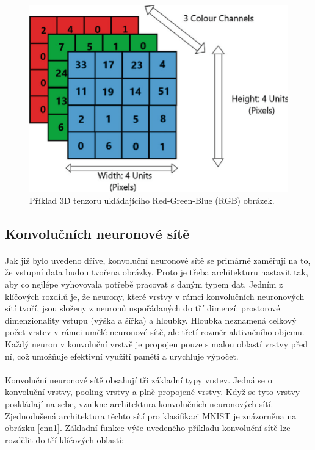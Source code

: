 \begin{figure}[h]\centering
    \centering
    \includegraphics[width=0.9\linewidth]{obrazky-figures/tensor.png}
    \caption{Příklad 3D tenzoru ukládajícího Red-Green-Blue (RGB) obrázek\protect\footnotemark{}.}
    \label{rgb_tensor}
\end{figure}

\subsection*{Konvolučních neuronové sítě}
\paragraph{}Jak již bylo uvedeno dříve, konvoluční neuronové sítě se primárně zaměřují na to, že vstupní data budou tvořena obrázky. Proto je třeba architekturu nastavit tak, aby co nejlépe vyhovovala potřebě pracovat s daným typem dat.
Jedním z klíčových rozdílů je, že neurony, které vrstvy v rámci konvolučních neuronových sítí tvoří, jsou složeny z neuronů uspořádaných do tří dimenzí: prostorové dimenzionality vstupu (výška a šířka) a hloubky. Hloubka neznamená celkový počet vrstev v rámci umělé neuronové sítě, ale třetí rozměr aktivačního objemu. Každý neuron v konvoluční vrstvě je propojen pouze s malou oblastí vrstvy před ní, což umožňuje efektivní využití paměti a urychluje výpočet.

\paragraph{}
Konvoluční neuronové sítě obsahují tři základní typy vrstev. Jedná se o konvoluční vrstvy, pooling vrstvy a plně propojené vrstvy. Když se tyto vrstvy poskládají na sebe, vznikne architektura konvolučních neuronových sítí. Zjednodušená architektura těchto sítí pro klasifikaci MNIST je znázorněna na obrázku \ref{cnn1}. Základní funkce výše uvedeného příkladu konvoluční sítě lze rozdělit do tří klíčových oblastí:

